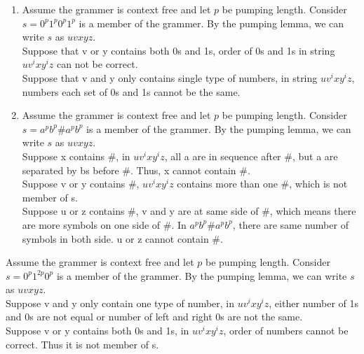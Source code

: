 \documentclass[12pt]{article}
\newenvironment{problem}[2][Problem]{\begin{trivlist}
\item[\hskip \labelsep {\bfseries #1}\hskip \labelsep {\bfseries #2.}]}{\end{trivlist}}
\begin{document}
\begin{problem}{2.30}
\end{problem}
\begin{enumerate}[label=(\alph*)]
	\item \addtocounter{enumi}{2}
		\hspace*{5mm} Assume the grammer is context free and let $p$ be pumping length. Consider $s=0^p1^p0^p1^p$ is a member of the grammer. By the pumping lemma, we can write $s$ as $uvxyz$. 	\\
		\hspace*{5mm} Suppose that v or y contains both 0s and 1s, order of 0s and 1s in string $uv^ixy^iz$ can not be correct. 	\\
		\hspace*{5mm} Suppose that v and y only contains single type of numbers, in string $uv^ixy^iz$, numbers each set of 0s and 1s cannot be the same.	

	\item
		\hspace*{5mm} Assume the grammer is context free and let $p$ be pumping length. Consider $s=a^pb^p\#a^pb^p$ is a member of the grammer. By the pumping lemma, we can write $s$ as $uvxyz$. 	\\
		\hspace*{5mm} Suppose x contains \#, in $uv^ixy^iz$, all a are in sequence after \#, but a are separated by bs before \#. Thus, x cannot contain \#. 	\\
		\hspace*{5mm} Suppose v or y contains \#, $uv^ixy^iz$ contains more than one \#, which is not member of s. 	\\
		\hspace*{5mm} Suppose u or z contains \#, v and y are at same side of \#, which means there are more symbols on one side of \#. In $a^pb^p\#a^pb^p$, there are same number of symbols in both side. u or z cannot contain \#. 

\end{enumerate}

\begin{problem}{2.31}
\end{problem}
	\hspace*{5mm} Assume the grammer is context free and let $p$ be pumping length. Consider $s=0^p1^{2p}0^p$ is a member of the grammer. By the pumping lemma, we can write $s$ as $uvxyz$. 	\\
	\hspace*{5mm} Suppose v and y only contain one type of number, in $uv^ixy^iz$, either number of 1s and 0s are not equal or number of left and right 0s are not the same. 	\\
	\hspace*{5mm} Suppose v or y contains both 0s and 1s, in $uv^ixy^iz$, order of numbers cannot be correct. Thus it is not member of s. 
\end{document}
